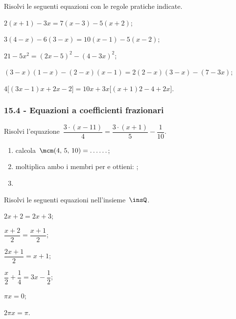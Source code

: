 \begin{esercizio}[\Ast]
\label{ese:15.22}
Risolvi le seguenti equazioni con le regole pratiche indicate.
 \begin{enumeratea}
 \item $2(x+1)-3x=7(x-3)-5(x+2)$;
 \item $3(4-x)-6(3-x)=10(x-1)-5(x-2)$;
 \item $21-5x^{2}=(2x-5)^{2}-(4-3x)^{2}$;
 \item $(3-x)(1-x)-(2-x)(x-1)=2(2-x)(3-x)-(7-3x)$;
 \item $4\big[(3x-1)x+2x-2\big]=10x+3x\big[(x+1)2-4+2x\big]$.
 \end{enumeratea}
\end{esercizio}

\subsubsection*{15.4 - Equazioni a coefficienti frazionari}

\begin{esercizio}[\Ast]
\label{ese:15.23}
Risolvi l'equazione~$\dfrac{3\cdot (x-11)}{4}=\dfrac{3\cdot (x+1)}{5}-\dfrac{1}{10}$.
\begin{enumerate}
 \item calcola~$\mcm(4\text{,~}5\text{,~}10) = \ldots \ldots$;
 \item moltiplica ambo i membri per \dotfill e ottieni: \dotfill;
 \item \dotfill
\end{enumerate}
\end{esercizio}

\begin{esercizio}
\label{ese:15.24}
Risolvi le seguenti equazioni nell'insieme~$\insQ$.
\begin{multicols}{3}
\begin{enumeratea}
 \item $2x+2=2x+3$;
 \item $\dfrac{x+2}{2}=\dfrac{x+1}{2}$;
 \item $\dfrac{2x+1}{2}=x+1$;
 \item $\dfrac{x}{2}+\dfrac{1}{4}=3x-\dfrac{1}{2}$;
 \item $\pi x=0$;
 \item $2\pi x=\pi$.
\end{enumeratea}
\end{multicols}
\end{esercizio}


